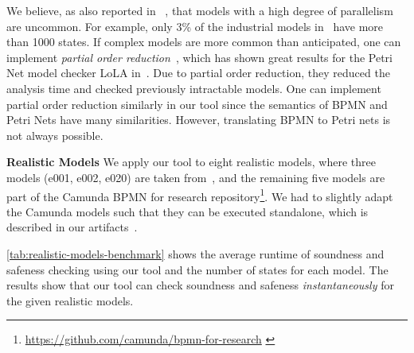 \documentclass[runningheads]{llncs}
\newcommand{\subpart}[1]{\vspace{1em}\noindent\textbf{#1}}
\begin{document}

We believe, as also reported in ~\cite{fahlandAnalysisDemandInstantaneous2011}, that models with a high degree of parallelism are uncommon.
For example, only 3\% of the industrial models in~\cite{fahlandAnalysisDemandInstantaneous2011} have more than 1000 states.
If complex models are more common than anticipated, one can implement \textit{partial order reduction}~\cite{clarkeHandbookModelChecking2018}, which has shown great results for the Petri Net model checker LoLA in~\cite{fahlandAnalysisDemandInstantaneous2011}.
Due to partial order reduction, they reduced the analysis time and checked previously intractable models.
One can implement partial order reduction similarly in our tool since the semantics of BPMN and Petri Nets have many similarities.
However, translating BPMN to Petri nets is not always possible. %

\subpart{Realistic Models}
We apply our tool to eight realistic models, where three models (e001, e002, e020) are taken from~\cite{houhouFirstOrderLogicVerification2022}, and the remaining five models are part of the Camunda BPMN for research repository\footnote{\url{https://github.com/camunda/bpmn-for-research} \label{footnote:camundaResearch}}.
We had to slightly adapt the Camunda models such that they can be executed standalone, which is described in our artifacts~\cite{noauthorgivenBPM2024Artifacts2024}.

\autoref{tab:realistic-models-benchmark} shows the average runtime of soundness and safeness checking using our tool and the number of states for each model.
The results show that our tool can check soundness and safeness \textit{instantaneously} for the given realistic models.
\end{document}
